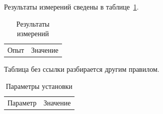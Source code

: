 Результаты измерений сведены в таблице~\ref{tab:results}.

\begin{table}[h]
  \caption{Результаты измерений}
  \label{tab:results}
  \begin{tabular}{ll}
    Опыт & Значение \\
  \end{tabular}
\end{table}

Таблица без ссылки разбирается другим правилом.

\begin{table}[h]
  \caption{Параметры установки}
  \label{tab:setup}
  \begin{tabular}{ll}
    Параметр & Значение \\
  \end{tabular}
\end{table}
